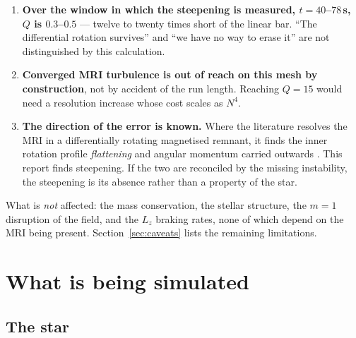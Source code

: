 \documentclass[11pt,a4paper]{article}
\begin{document}
\begin{enumerate}\itemsep2pt
\item \textbf{Over the window in which the steepening is measured,
      $t = 40$--$78$\,s, $Q$ is $0.3$--$0.5$} --- twelve to twenty times short
      of the linear bar. ``The differential rotation survives'' and ``we have
      no way to erase it'' are not distinguished by this calculation.
\item \textbf{Converged MRI turbulence is out of reach on this mesh by
      construction}, not by accident of the run length. Reaching $Q = 15$ would
      need a resolution increase whose cost scales as $N^4$.
\item \textbf{The direction of the error is known.} Where the literature
      resolves the MRI in a differentially rotating magnetised remnant, it
      finds the inner rotation profile \emph{flattening} and angular momentum
      carried outwards \citep{miravet2025}. This report finds steepening. If
      the two are reconciled by the missing instability, the steepening is its
      absence rather than a property of the star.
\end{enumerate}

What is \emph{not} affected: the mass conservation, the stellar structure, the
$m=1$ disruption of the field, and the $L_z$ braking rates, none of which
depend on the MRI being present. Section~\ref{sec:caveats} lists the remaining
limitations.

\section{What is being simulated}

\subsection{The star}
\end{document}
